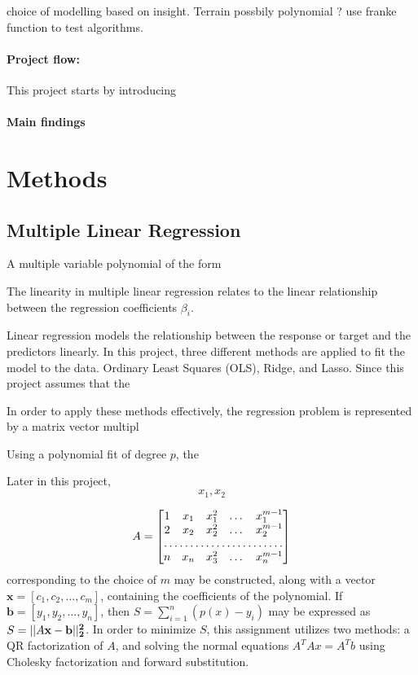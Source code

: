 \documentclass[%
oneside,                 %
final,                   %
10pt]{article}
\begin{document}
choice of modelling based on insight. Terrain possbily polynomial ? use franke function to test algorithms. 
\paragraph{Project flow:} This project starts by introducing 
\paragraph{Main findings}


\section{Methods}
\subsection{Multiple Linear Regression}


A multiple variable polynomial of the form




The linearity in multiple linear regression relates to the linear relationship between the regression coefficients $\beta_i$. 


Linear regression models the relationship between the response or target and the predictors linearly. In this project, three different methods are applied to fit the model to the data. Ordinary Least Squares (OLS), Ridge, and Lasso. Since this project assumes that the 


In order to apply these methods effectively, the regression problem is represented by a matrix vector multipl

Using a polynomial fit of degree $p$, the 

Later in this project, 
\begin{equation}
x_1, x_2
\end{equation} 

\begin{equation}
A=\begin{bmatrix}
    1       & x_1 & x_1^2 & \dots & x_1^{m-1} \\
    2       & x_2 & x_2^2 & \dots & x_2^{m-1} \\
    \hdotsfor{5} \\
    n       & x_n & x_3^2 & \dots & x_n^{m-1}
\end{bmatrix}
\end{equation}
corresponding to the choice of $m$ may be constructed, along with a vector $\bm{x} =[c_1,c_2, \dots,c_m]$, containing the coefficients of the polynomial. If $\bm{b}=[y_1,y_2,\dots,y_n]$, then $S=\sum_{i=1}^n (p(x)-y_i)$ may be expressed as $S=||A\bf x - \bf b ||^2_2$. In order to minimize $S$, this assignment utilizes two methods: a QR factorization of $A$, and solving the normal equations $A^TAx=A^Tb$ using Cholesky factorization and forward substitution.
\end{document}
